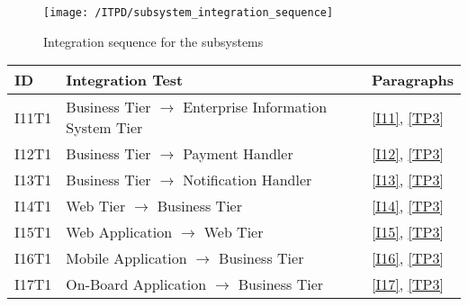 	\begin{figure}[!ht]
	  \centering
	  \vspace{0.2cm}
	  \texttt{[image: /ITPD/subsystem\_integration\_sequence]}\\
	  \vspace{0.2cm}
	  \caption{Integration sequence for the subsystems} 
	  \label{fig:subsystem_integration_sequence} 
	\end{figure}

	\begin{center}
		\vspace{0.6cm}
		\begin{tabular}{|l|l|l|}
			\hline
			\textbf{ID} & \textbf{Integration Test} & \textbf{Paragraphs} \bigstrut \\\hline
			\hline
			I11T1 & Business Tier \ensuremath{\rightarrow} Enterprise Information System Tier & \ref{I11}, \ref{TP3} \bigstrut \\\hline
			I12T1 & Business Tier \ensuremath{\rightarrow} Payment Handler & \ref{I12}, \ref{TP3} \bigstrut \\\hline
			I13T1 & Business Tier \ensuremath{\rightarrow} Notification Handler & \ref{I13}, \ref{TP3} \bigstrut \\\hline
			I14T1 & Web Tier \ensuremath{\rightarrow} Business Tier & \ref{I14}, \ref{TP3} \bigstrut \\\hline
			I15T1 & Web Application \ensuremath{\rightarrow} Web Tier & \ref{I15}, \ref{TP3} \bigstrut \\\hline
			I16T1 & Mobile Application \ensuremath{\rightarrow} Business Tier & \ref{I16}, \ref{TP3} \bigstrut \\\hline
			I17T1 & On-Board Application \ensuremath{\rightarrow} Business Tier & \ref{I17}, \ref{TP3} \bigstrut \\\hline
		\end{tabular}
	\end{center}

